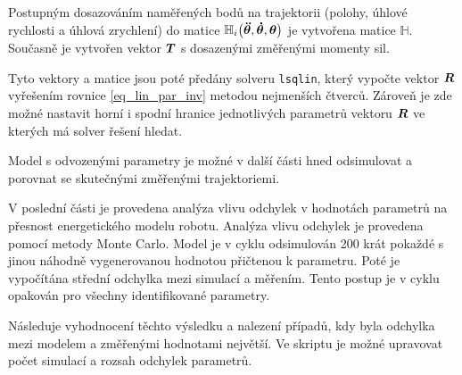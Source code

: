 Postupným dosazováním naměřených bodů na trajektorii (polohy, úhlové rychlosti a úhlová zrychlení) do matice $\mathbb{H}_i\big(\boldsymbol{\ddot{\theta}},\boldsymbol{\dot{\theta}},\boldsymbol{\theta}\big)$ je vytvořena matice $\mathbb{H}$. Současně je vytvořen vektor $\boldsymbol{T}$ s dosazenými změřenými momenty sil.

Tyto vektory a matice jsou poté předány solveru \texttt{lsqlin}, který vypočte vektor $\boldsymbol{R}$ vyřešením rovnice \eqref{eq_lin_par_inv} metodou nejmenších čtverců. Zároveň je zde možné nastavit horní i spodní hranice jednotlivých parametrů vektoru $\boldsymbol{R}$ ve kterých má solver řešení hledat.

Model s odvozenými parametry je možné v další části hned odsimulovat a porovnat se skutečnými změřenými trajektoriemi.

V poslední části je provedena analýza vlivu odchylek v hodnotách parametrů na přesnost energetického modelu robotu. Analýza vlivu odchylek je provedena pomocí metody Monte Carlo. Model je v cyklu odsimulován 200 krát pokaždé s jinou náhodně vygenerovanou hodnotou přičtenou k parametru. Poté je vypočítána střední odchylka mezi simulací a měřením. Tento postup je v cyklu opakován pro všechny identifikované parametry. 

Následuje vyhodnocení těchto výsledku a nalezení případů, kdy byla odchylka mezi modelem a změřenými hodnotami největší. Ve skriptu je možné upravovat počet simulací a rozsah odchylek parametrů.  

